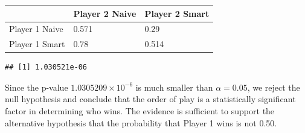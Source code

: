 \documentclass[
]{article}
\newenvironment{Shaded}{\begin{snugshade}}{\end{snugshade}}
\newcommand{\AttributeTok}[1]{\textcolor[rgb]{0.13,0.29,0.53}{#1}}
\newcommand{\CommentTok}[1]{\textcolor[rgb]{0.56,0.35,0.01}{\textit{#1}}}
\newcommand{\DecValTok}[1]{\textcolor[rgb]{0.00,0.00,0.81}{#1}}
\newcommand{\FloatTok}[1]{\textcolor[rgb]{0.00,0.00,0.81}{#1}}
\newcommand{\FunctionTok}[1]{\textcolor[rgb]{0.13,0.29,0.53}{\textbf{#1}}}
\newcommand{\NormalTok}[1]{#1}
\newcommand{\OtherTok}[1]{\textcolor[rgb]{0.56,0.35,0.01}{#1}}
\newcommand{\SpecialCharTok}[1]{\textcolor[rgb]{0.81,0.36,0.00}{\textbf{#1}}}
\newcommand{\StringTok}[1]{\textcolor[rgb]{0.31,0.60,0.02}{#1}}
\begin{document}
\begin{longtable}[]{@{}lll@{}}
\toprule\noalign{}
& Player 2 Naive & Player 2 Smart \\
\midrule\noalign{}
\endhead
\bottomrule\noalign{}
\endlastfoot
Player 1 Naive & 0.571 & 0.29 \\
Player 1 Smart & 0.78 & 0.514 \\
\end{longtable}

\begin{Shaded}
\end{Shaded}

\begin{verbatim}
## [1] 1.030521e-06
\end{verbatim}

Since the p-value \ensuremath{1.0305209\times 10^{-6}} is much smaller
than \(\alpha=0.05\), we reject the null hypothesis and conclude that
the order of play is a statistically significant factor in determining
who wins. The evidence is sufficient to support the alternative
hypothesis that the probability that Player 1 wins is not 0.50.
\end{document}

